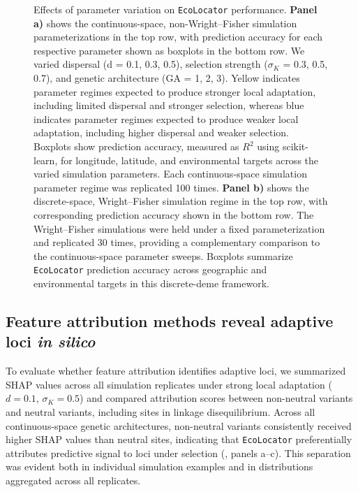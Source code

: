 \documentclass[]{article}
\newcommand{\ecolocator}{\texttt{EcoLocator}\xspace}
\begin{document}
\begin{figure}[H] 
    \caption{Effects of parameter variation on \ecolocator performance. \textbf{Panel a)} 
    shows the continuous-space, non-Wright--Fisher simulation
    parameterizations in the top row, with prediction accuracy for each respective
    parameter shown as boxplots in the bottom row. We varied dispersal
    (d = 0.1, 0.3, 0.5), selection strength
    (\(\sigma_K\) = 0.3, 0.5, 0.7), and genetic architecture
    (GA = 1, 2, 3). Yellow indicates parameter regimes expected to produce
    stronger local adaptation, including limited dispersal and stronger selection,
    whereas blue indicates parameter regimes expected to produce weaker local adaptation, 
    including higher dispersal and weaker selection.
    Boxplots show prediction accuracy, measured as $R^2$ using scikit-learn,
    for longitude, latitude, and environmental targets across the varied
    simulation parameters. Each continuous-space simulation parameter regime
    was replicated 100 times. \textbf{Panel b)} shows the discrete-space,
    Wright--Fisher simulation regime in the top row, with corresponding
    prediction accuracy shown in the bottom row. The Wright--Fisher simulations
    were held under a fixed parameterization and replicated 30 times,
    providing a complementary comparison to the continuous-space parameter
    sweeps. Boxplots summarize \ecolocator prediction accuracy across
    geographic and environmental targets in this discrete-deme framework.} 
    \label{fig:sim-performance}
\end{figure}

\subsection{Feature attribution methods reveal adaptive loci \textit{in silico}}

To evaluate whether feature attribution identifies adaptive loci,
we summarized SHAP values across all simulation replicates under
strong local adaptation ($d = 0.1$, $\sigma_K = 0.5$)
and compared attribution scores between non-neutral variants
and neutral variants,
including sites in linkage disequilibrium.
Across all continuous-space genetic architectures,
non-neutral variants consistently received higher SHAP values
than neutral sites,
indicating that \ecolocator preferentially attributes predictive signal
to loci under selection
(, panels a--c).
This separation was evident both in individual simulation examples
and in distributions aggregated across all replicates.
\end{document}
